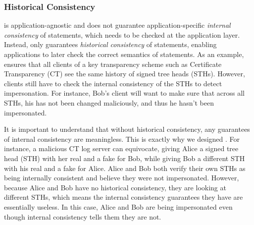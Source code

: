 \subsubsection{Historical Consistency}
\label{sec:discussion:agnostic}
\Sys is application-agnostic and does not guarantee application-specific \emph{internal consistency}\cite{ht} of statements, which needs to be checked at the application layer.
Instead, \Sys only guarantees \emph{historical consistency}\cite{ht} of statements, enabling applications to later check the correct semantics of statements.
As an example, \Sys ensures that all clients of a key transparency scheme such as Certificate Transparency (CT)\cite{ct} see the same history of signed tree heads (STHs).
However, clients still have to check the internal consistency of the STHs to detect impersonation.
For instance, Bob's client will want to make sure that across all STHs, his \pk has not been changed maliciously, and thus he hasn't been impersonated.

It is important to understand that without historical consistency, any guarantees of internal consistency are meaningless.
This is exactly why we designed \Sys. 
For instance, a malicious CT log server\cite{ct} can equivocate, giving Alice a signed tree head (STH) with her real \pk and a fake \pk for Bob, while giving Bob a different STH with his real \pk and a fake \pk for Alice.
Alice and Bob both verify their own STHs as being internally consistent and believe they were not impersonated.
However, because Alice and Bob have no historical consistency, they are looking at different STHs, which means the internal consistency guarantees they have are essentially useless.
In this case, Alice and Bob are being impersonated even though internal consistency tells them they are not.